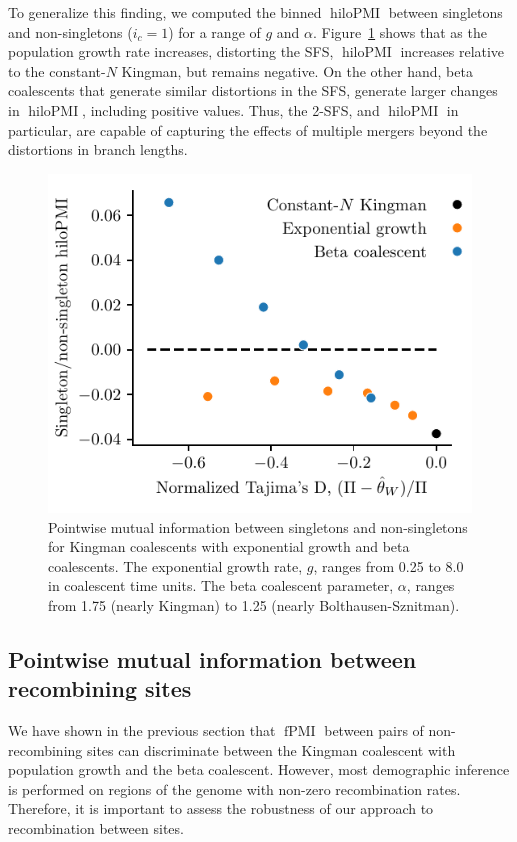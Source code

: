 \documentclass[11pt, letterpaper]{article}   	%
\newcommand{\Fig}[1]{Figure~\ref{#1}}
\DeclareMathOperator{\fpmi}{fPMI}
\DeclareMathOperator{\hilopmi}{hiloPMI}
\begin{document}
To generalize this finding, we computed the binned $\hilopmi$ between singletons and non-singletons ($i_c = 1$) for a range of $g$ and $\alpha$.
\Fig{fig:fpmi_vs_tajimasd} shows that as the population growth rate increases, distorting the SFS, $\hilopmi$ increases relative to the constant-$N$ Kingman, but remains negative.
On the other hand, beta coalescents that generate similar distortions in the SFS, generate larger changes in $\hilopmi$, including positive values.
Thus, the 2-SFS, and $\hilopmi$ in particular, are capable of capturing the effects of multiple mergers beyond the distortions in branch lengths.

\begin{figure}
\centering
\includegraphics[scale=1]{figures/hilopmi_vs_tajimasD_no_recombination.pdf}
\caption{Pointwise mutual information between singletons and non-singletons for Kingman coalescents with exponential growth and beta coalescents. The exponential growth rate, $g$, ranges from 0.25 to 8.0 in coalescent time units. The beta coalescent parameter, $\alpha$, ranges from 1.75 (nearly Kingman) to 1.25 (nearly Bolthausen-Sznitman). \label{fig:fpmi_vs_tajimasd}}
\end{figure}

\subsection*{Pointwise mutual information between recombining sites}

We have shown in the previous section that $\fpmi$ between pairs of non-recombining sites can discriminate between the Kingman coalescent with population growth and the beta coalescent.
However, most demographic inference is performed on regions of the genome with non-zero recombination rates.
Therefore, it is important to assess the robustness of our approach to recombination between sites.
\end{document}
